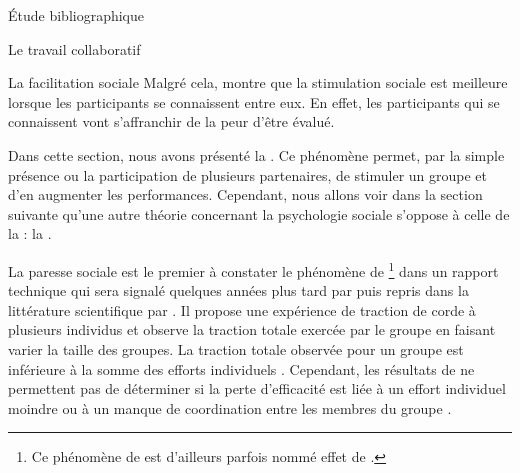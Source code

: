 \documentclass[myfrancais,ngerman,english,frenchb]{mythesis}
\begin{document}
\begin{mychapter}{Étude bibliographique}
\begin{mysection}{Le travail collaboratif}
\begin{mysubsection}{La facilitation sociale}
				Malgré cela,  montre que la stimulation sociale est meilleure lorsque les participants se connaissent entre eux.
				En effet, les participants qui se connaissent vont s'affranchir de la peur d'être évalué.

				Dans cette section, nous avons présenté la .
				Ce phénomène permet, par la simple présence ou la participation de plusieurs partenaires, de stimuler un groupe et d'en augmenter les performances.
				Cependant, nous allons voir dans la section suivante qu'une autre théorie concernant la psychologie sociale s'oppose à celle de la  : la .
			\end{mysubsection}
			\begin{mysubsection}{La paresse sociale}
				 est le premier à constater le phénomène de \footnote{Ce phénomène de  est d'ailleurs parfois nommé \og effet de  \fg.} dans un rapport technique qui sera signalé quelques années plus tard par  puis repris dans la littérature scientifique par .
				Il propose une expérience de traction de corde à plusieurs individus et observe la traction totale exercée par le groupe en faisant varier la taille des groupes.
				La traction totale observée pour un groupe est inférieure à la somme des efforts individuels .
				Cependant, les résultats de  ne permettent pas de déterminer si la perte d'efficacité est liée à un effort individuel moindre ou à un manque de coordination entre les membres du groupe .


\end{mysubsection}
\end{mysection}
\end{mychapter}
\end{document}
